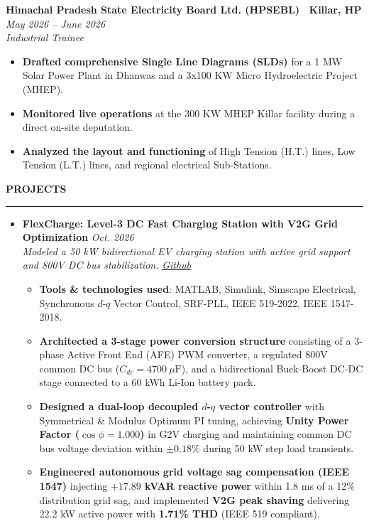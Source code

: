 \documentclass[a4paper,10pt]{article}
\begin{document}
\textbf{Himachal Pradesh State Electricity Board Ltd. (HPSEBL) \textbar\ Killar, HP} \hfill \textit{May 2026 -- June 2026} \\
\textit{Industrial Trainee}
\begin{itemize}[leftmargin=15pt, itemsep=1pt, topsep=2pt]
    \item \textbf{Drafted comprehensive Single Line Diagrams (SLDs)} for a 1 MW Solar Power Plant in Dhanwas and a 3x100 KW Micro Hydroelectric Project (MHEP).
    \item \textbf{Monitored live operations} at the 300 KW MHEP Killar facility during a direct on-site deputation.
    \item \textbf{Analyzed the layout and functioning} of High Tension (H.T.) lines, Low Tension (L.T.) lines, and regional electrical Sub-Stations.
\end{itemize}

\vspace{6pt}

{\large \textbf{PROJECTS}}
\vspace{-4pt}
\hrule
\vspace{4pt}

\begin{itemize}[leftmargin=12pt, itemsep=3pt, topsep=2pt, label=\textbullet]
    \item \textbf{FlexCharge: Level-3 DC Fast Charging Station with V2G Grid Optimization} \hfill \textit{Oct. 2026} \\
    \textit{Modeled a 50 kW bidirectional EV charging station with active grid support and 800V DC bus stabilization.} \hfill \href{https://github.com/rakshitsh45/FlexCharge}{\textit{Github}}
    \begin{itemize}[leftmargin=15pt, itemsep=1pt, topsep=1pt, label=-]
        \item \textbf{Tools \& technologies used}: MATLAB, Simulink, Simscape Electrical, Synchronous $d$-$q$ Vector Control, SRF-PLL, IEEE 519-2022, IEEE 1547-2018.
        \item \textbf{Architected a 3-stage power conversion structure} consisting of a 3-phase Active Front End (AFE) PWM converter, a regulated 800V common DC bus ($C_{dc} = 4700\ \mu\text{F}$), and a bidirectional Buck-Boost DC-DC stage connected to a 60 kWh Li-Ion battery pack.
        \item \textbf{Designed a dual-loop decoupled $d$-$q$ vector controller} with Symmetrical \& Modulus Optimum PI tuning, achieving \textbf{Unity Power Factor ($\cos\phi = 1.000$)} in G2V charging and maintaining common DC bus voltage deviation within $\pm 0.18\%$ during 50 kW step load transients.
        \item \textbf{Engineered autonomous grid voltage sag compensation (IEEE 1547)} injecting \textbf{$+17.89$ kVAR reactive power} within 1.8 ms of a 12\% distribution grid sag, and implemented \textbf{V2G peak shaving} delivering 22.2 kW active power with \textbf{1.71\% THD} (IEEE 519 compliant).
    \end{itemize}
\end{itemize}
\end{document}
